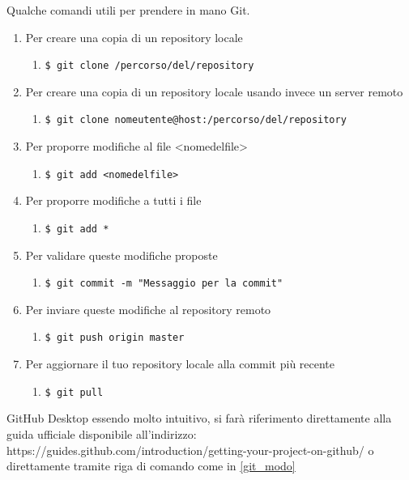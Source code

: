 \documentclass[a4paper,11pt]{article}
\begin{document}
		 \label{git_modo} 
		Qualche comandi utili per prendere in mano Git\addglos .
		\begin{enumerate}			
			\item Per creare una copia di un repository locale
			\begin{enumerate} \item[] \texttt{\$ git clone /percorso/del/repository}\end{enumerate}
			\item Per creare una copia di un repository locale usando invece un server remoto 
			\begin{enumerate} \item[] \texttt{\$ git clone nomeutente@host:/percorso/del/repository} \end{enumerate}
			\item Per proporre modifiche al file <nomedelfile>		
			\begin{enumerate} \item[] \texttt{\$ git add <nomedelfile> } \end{enumerate}
			\item Per proporre modifiche a tutti i file
			\begin{enumerate} \item[] \texttt{\$ git add * }\end{enumerate}
			\item Per validare queste modifiche proposte 
			\begin{enumerate} \item[] \texttt{\$ git commit -m "Messaggio per la commit"}  \end{enumerate}
			\item Per inviare queste modifiche al repository remoto
			\begin{enumerate} \item[] \texttt{\$ git push origin master }\end{enumerate}
			\item Per aggiornare il tuo repository locale alla commit più recente	
			\begin{enumerate} \item[] \texttt{\$ git pull } \end{enumerate}
		\end{enumerate}
			GitHub Desktop essendo molto intuitivo, si farà riferimento direttamente alla guida ufficiale disponibile all'indirizzo: https://guides.github.com/introduction/getting-your-project-on-github/  o direttamente tramite riga di comando come in \ref{git_modo} 
\end{document}
